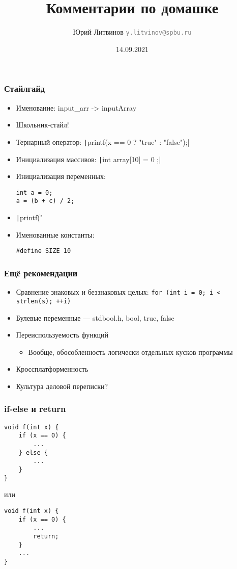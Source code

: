 \documentclass[xetex,mathserif,serif]{beamer}
\title{Комментарии по домашке}
\author[Юрий Литвинов]{Юрий Литвинов \newline \textcolor{gray}{\small\texttt{y.litvinov@spbu.ru}}}
\date{14.09.2021}
\begin{document}
    
    \frame{\titlepage}
    
    \begin{frame}[fragile]
        \frametitle{Стайлгайд}
        \begin{itemize}
            \item Именование: input\_arr -> inputArray
            \item Школьник-стайл!
            \item Тернарный оператор: \texttt|printf(x == 0 ? "true" :  "false");|
            \item Инициализация массивов: \texttt|int array[10] = { 0 };|
            \item Инициализация переменных:
                \begin{verbatim}
int a = 0;
a = (b + c) / 2;
                \end{verbatim}
            \item \texttt|printf("%
            \item Именованные константы: 
                \begin{verbatim}
#define SIZE 10
                \end{verbatim}
        \end{itemize}
    \end{frame}

    \begin{frame}[fragile]
        \frametitle{Ещё рекомендации}
        \begin{itemize}
            \item Сравнение знаковых и беззнаковых целых: \texttt{for (int i = 0; i < strlen(s); ++i)}
            \item Булевые переменные --- stdbool.h, bool, true, false
            \item Переиспользуемость функций
            \begin{itemize}
                \item Вообще, обособленность логически отдельных кусков программы
            \end{itemize}
            \item Кроссплатформенность
            \item Культура деловой переписки?
        \end{itemize}
    \end{frame}

    \begin{frame}[fragile]
        \frametitle{if-else и return}
        \begin{verbatim}
void f(int x) {
    if (x == 0) {
        ...
    } else {
        ...
    }
}
        \end{verbatim}
        или
        \begin{verbatim}
void f(int x) {
    if (x == 0) {
        ...
        return;
    } 
    ...
}
        \end{verbatim}
    \end{frame}
\end{document}
